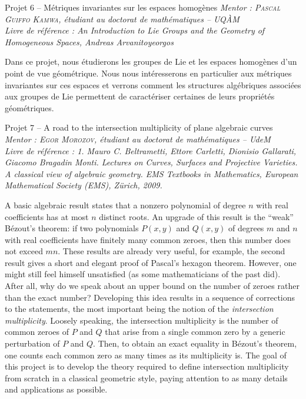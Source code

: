 \vspace{0.8em}

\begin{projectbox}{Projet 6 -- Métriques invariantes sur les espaces homogènes}
\textit{Mentor : \textsc{Pascal Guiffo Kamwa}, étudiant au doctorat de mathématiques -- UQ\`AM}\\
\textit{Livre de référence : An Introduction to Lie Groups and the Geometry of Homogeneous Spaces, Andreas Arvanitoyeorgos}

\medskip
\noindent Dans ce projet, nous étudierons les groupes de Lie et les espaces homogènes d’un point de vue géométrique. Nous nous intéresserons en particulier aux métriques invariantes sur ces espaces et verrons comment les structures algébriques associées aux groupes de Lie permettent de caractériser certaines de leurs propriétés géométriques.
\end{projectbox}

\vspace{0.8em}

\begin{projectbox}{Projet 7 -- A road to the intersection multiplicity of plane algebraic curves}
\textit{Mentor : \textsc{Egor Morozov}, étudiant au doctorat de mathématiques -- UdeM}\\
\textit{Livre de référence : 1. Mauro C. Beltrametti, Ettore Carletti, Dionisio Gallarati, Giacomo Bragadin Monti. Lectures on Curves, Surfaces and Projective Varieties. A classical view of algebraic geometry. EMS Textbooks in Mathematics, European Mathematical Society (EMS), Z\"urich, 2009.}

\medskip
\noindent A basic algebraic result states that a nonzero polynomial of degree $n$ with real coefficients has at most $n$ distinct roots. An upgrade of this result is the ``weak'' B\'ezout's theorem: if two polynomials $P(x,y)$ and $Q(x,y)$ of degrees $m$ and $n$ with real coefficients have finitely many common zeroes, then this number does not exceed $mn$. These results are already very useful, for example, the second result gives a short and elegant proof of Pascal's hexagon theorem. However, one might still feel himself unsatisfied (as some mathematicians of the past did). After all, why do we speak about an upper bound on the number of zeroes rather than the exact number? Developing this idea results in a sequence of corrections to the statements, the most important being the notion of the \emph{intersection multiplicity}. Loosely speaking, the intersection multiplicity is the number of common zeroes of $P$ and $Q$ that arise from a single common zero by a generic perturbation of $P$ and $Q$. Then, to obtain an exact equality in B\'ezout's theorem, one counts each common zero as many times as its multiplicity is. The goal of this project is to develop the theory required to define intersection multiplicity from scratch in a classical geometric style, paying attention to as many details and applications as possible. 
\end{projectbox}
